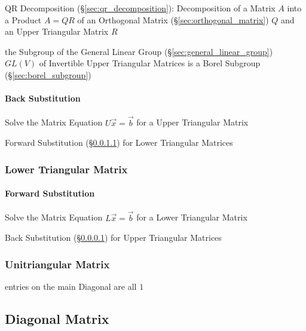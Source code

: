 QR Decomposition (\S\ref{sec:qr_decomposition}): Decomposition of a Matrix $A$
into a Product $A = QR$ of an Orthogonal Matrix (\S\ref{sec:orthogonal_matrix})
$Q$ and an Upper Triangular Matrix $R$

the Subgroup of the General Linear Group (\S\ref{sec:general_linear_group})
$GL(V)$ of Invertible Upper Triangular Matrices is a Borel Subgroup
(\S\ref{sec:borel_subgroup})



\paragraph{Back Substitution}\label{sec:back_substitution}\hfill

Solve the Matrix Equation $U\vec{x} = \vec{b}$ for a Upper Triangular Matrix

\fist Forward Substitution (\S\ref{sec:forward_substitution}) for Lower
Triangular Matrices



\subsubsection{Lower Triangular Matrix}\label{sec:lower_triangular}

\paragraph{Forward Substitution}\label{sec:forward_substitution}\hfill

Solve the Matrix Equation $L\vec{x} = \vec{b}$ for a Lower Triangular Matrix

\fist Back Substitution (\S\ref{sec:back_substitution}) for Upper Triangular
Matrices



\subsubsection{Unitriangular Matrix}\label{sec:unitriangular_matrix}

entries on the main Diagonal are all $1$



\subsection{Diagonal Matrix}\label{sec:diagonal_matrix}

